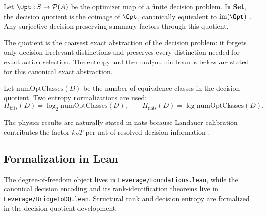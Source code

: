 \begin{proposition}\label{prop:optimizer-quotient}
Let $\Opt : S \to \mathcal P(A)$ be the optimizer map of a finite decision problem. In \textbf{Set}, the decision quotient is the coimage of $\Opt$, canonically equivalent to $\operatorname{im}(\Opt)$ \cite{maclane1998categories}. Any surjective decision-preserving summary factors through this quotient.
\end{proposition}

The quotient is the coarsest exact abstraction of the decision problem: it forgets only decision-irrelevant distinctions and preserves every distinction needed for exact action selection. The entropy and thermodynamic bounds below are stated for this canonical exact abstraction.

\begin{definition}\label{def:decision-entropy}
Let $\mathrm{numOptClasses}(D)$ be the number of equivalence classes in the decision quotient. Two entropy normalizations are used:
\[
H_{\mathrm{bits}}(D) = \log_2 \mathrm{numOptClasses}(D),
\qquad
H_{\mathrm{nats}}(D) = \log \mathrm{numOptClasses}(D).
\]
\end{definition}

The physics results are naturally stated in nats because Landauer calibration contributes the factor $k_B T$ per nat of resolved decision information \cite{landauer1961irreversibility,bennett1982thermodynamics}.

\subsection{Formalization in Lean}

The degree-of-freedom object lives in \texttt{Leverage/Foundations.lean}, while the canonical decision encoding and its rank-identification theorems live in \texttt{Leverage/BridgeToDQ.lean}. Structural rank and decision entropy are formalized in the decision-quotient development.
